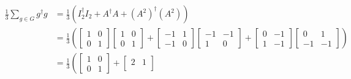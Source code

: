 \documentclass{article}
\begin{document}
\begin{align*}
    \frac{1}{3} \sum_{g \in G} g^\dag g &= \frac{1}{3} \left( I_2^\dag I_2 + A^\dag A + (A^2)^\dag (A^2) \right) \\
                                       &= \frac{1}{3} \left( \begin{bmatrix}
                                               1 & 0 \\
                                               0 & 1
                                       \end{bmatrix} \begin{bmatrix}
                                               1 & 0 \\
                                               0 & 1
                                       \end{bmatrix} + \begin{bmatrix}
                                               -1 & 1 \\
                                               -1 & 0
                                       \end{bmatrix} \begin{bmatrix}
                                               -1 & -1 \\
                                               1 & 0
                                       \end{bmatrix} + \begin{bmatrix}
                                               0 & -1 \\
                                               1 & -1
                                       \end{bmatrix} \begin{bmatrix}
                                               0 & 1 \\
                                               -1 & -1
                                       \end{bmatrix} \right) \\
                                       &= \frac{1}{3} \left( \begin{bmatrix}
                                               1 & 0 \\
                                               0 & 1
                                       \end{bmatrix} + \begin{bmatrix}
                                               2 & 1 \\

\end{bmatrix}
\end{align*}
\end{document}
